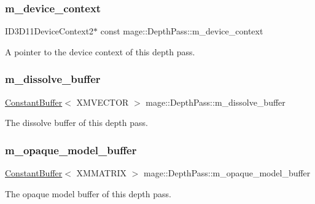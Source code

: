 \subsubsection{\texorpdfstring{m\+\_\+device\+\_\+context}{m\_device\_context}}
{\footnotesize\ttfamily I\+D3\+D11\+Device\+Context2$\ast$ const mage\+::\+Depth\+Pass\+::m\+\_\+device\+\_\+context\hspace{0.3cm}{\ttfamily [private]}}

A pointer to the device context of this depth pass. \hypertarget{classmage_1_1_depth_pass_ab8ef293d922a965a92825b8226b9d87c}{}\label{classmage_1_1_depth_pass_ab8ef293d922a965a92825b8226b9d87c} 
\subsubsection{\texorpdfstring{m\+\_\+dissolve\+\_\+buffer}{m\_dissolve\_buffer}}
{\footnotesize\ttfamily \hyperlink{structmage_1_1_constant_buffer}{Constant\+Buffer}$<$ X\+M\+V\+E\+C\+T\+OR $>$ mage\+::\+Depth\+Pass\+::m\+\_\+dissolve\+\_\+buffer\hspace{0.3cm}{\ttfamily [private]}}

The dissolve buffer of this depth pass. \hypertarget{classmage_1_1_depth_pass_a4e466580656eb0602d2e00c29b2435a0}{}\label{classmage_1_1_depth_pass_a4e466580656eb0602d2e00c29b2435a0} 
\subsubsection{\texorpdfstring{m\+\_\+opaque\+\_\+model\+\_\+buffer}{m\_opaque\_model\_buffer}}
{\footnotesize\ttfamily \hyperlink{structmage_1_1_constant_buffer}{Constant\+Buffer}$<$ X\+M\+M\+A\+T\+R\+IX $>$ mage\+::\+Depth\+Pass\+::m\+\_\+opaque\+\_\+model\+\_\+buffer\hspace{0.3cm}{\ttfamily [private]}}

The opaque model buffer of this depth pass. \hypertarget{classmage_1_1_depth_pass_aa410d0303d18d621a7894695b87ccfc2}{}\label{classmage_1_1_depth_pass_aa410d0303d18d621a7894695b87ccfc2} 
